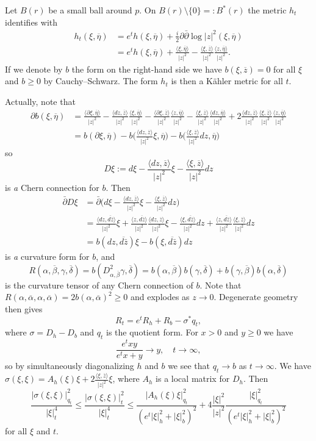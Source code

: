 \documentclass[10pt,a4paper]{amsart}
\def\<{\langle}
\def\>{\rangle}
\def\ov#1{\overline{#1}}
\begin{document}
Let $B(r)$ be a small ball around $p$.
On $B(r) \setminus \{0\} =: B^*(r)$
the metric $h_t$ identifies with
\begin{align*}
h_t(\xi, \ov\eta)
&= e^t h(\xi, \ov\eta) + \tfrac i2 \partial \bar\partial \log |z|^2(\xi, \ov\eta)
\\
&= e^t h(\xi, \ov\eta)
+ \frac{\<\xi, \ov\eta\>}{|z|^2}
- \frac{\<\xi, \ov z\>}{|z|^2}
\frac{\<z, \ov\eta\>}{|z|^2}.
\end{align*}
If we denote by $b$ the form on the right-hand side we have $b(\xi, \ov z) = 0$
for all $\xi$ and $b \geq 0$ by Cauchy--Schwarz.
The form $h_t$ is then a K\"ahler metric for all $t$.


Actually, note that
\begin{align*}
\partial b(\xi, \ov\eta)
&= \frac{\<\partial \xi, \ov\eta\>}{|z|^2}
{-} \frac{\<dz, \ov z\>}{|z|^2} \frac{\<\xi, \ov\eta\>}{|z|^2}
{-} \frac{\<\partial \xi, \ov z\>}{|z|^2} \frac{\<z, \ov\eta\>}{|z|^2}
{-} \frac{\<\xi, \ov z\>}{|z|^2} \frac{\<dz, \ov\eta\>}{|z|^2}
{+} 2\frac{\<dz, \ov z\>}{|z|^2} \frac{\<\xi, \ov z\>}{|z|^2} \frac{\<z, \ov\eta\>}{|z|^2}
\\
&= b(\partial \xi, \ov\eta)
- b\biggl(\frac{\<dz, \ov z\>}{|z|^2} \xi, \ov\eta\biggr)
- b\biggl(\frac{\<\xi, \ov z\>}{|z|^2} dz, \ov\eta\biggr)
\end{align*}
so
$$
D\xi := d \xi
- \frac{\<dz, \ov z\>}{|z|^2} \xi
- \frac{\<\xi, \ov z\>}{|z|^2} dz
$$
is \emph{a} Chern connection for $b$.
Then
\begin{align*}
\bar\partial D \xi
&= \bar\partial \biggl(
d \xi
- \frac{\<dz, \ov z\>}{|z|^2} \xi
- \frac{\<\xi, \ov z\>}{|z|^2} dz
\biggr)
\\
&= \frac{\<dz, \ov{d\bar z}\>}{|z|^2} \xi
+ \frac{\<z, \ov{d\bar z}\>}{|z|^2} \frac{\<dz, \ov z\>}{|z|^2} \xi
- \frac{\<\xi, \ov{d\bar z}\>}{|z|^2} dz
+ \frac{\<z, \ov{d\bar z}\>}{|z|^2} \frac{\<\xi, \ov z\>}{|z|^2} dz
\\
&= b(dz, \ov{d\bar z}) \xi - b(\xi, \ov{d\bar z}) dz
\end{align*}
is \emph{a} curvature form for $b$, and
$$
R(\alpha,\ov\beta,\gamma,\ov\delta)
= b(D^2_{\alpha,\ov\beta} \gamma, \ov\delta)
= b(\alpha, \ov\beta) b(\gamma, \ov\delta)
+ b(\gamma, \ov\beta) b(\alpha, \ov\delta)
$$
is the curvature tensor of any Chern connection of $b$.
Note that $R(\alpha,\ov\alpha,\alpha,\ov\alpha) = 2 b(\alpha,\ov\alpha)^2 \geq 0$
and explodes as $z \to 0$.
Degenerate geometry then gives
$$
R_t = e^t R_h + R_b - \sigma^* q_t,
$$
where $\sigma = D_h - D_b$ and $q_t$ is the quotient form.
For $x > 0$ and $y \geq 0$ we have
$$
\frac{e^t x y}{e^t x + y} \to y,
\quad
t \to \infty,
$$
so by simultaneously diagonalizing $h$ and $b$ we see that $q_t \to b$ as $t
\to \infty$.
We have $\sigma(\xi, \xi) = A_h(\xi) \xi + 2\frac{\<\xi, \ov z\>}{|z|^2} \xi$,
where $A_h$ is a local matrix for $D_h$.
Then
$$
\frac{|\sigma(\xi, \xi)|_{q_t}^2}{|\xi|_t^4}
\leq \frac{|\sigma(\xi, \xi)|_{t}^2}{|\xi|_t^4}
\leq
\frac{|A_h(\xi) \xi|^2_{q_t}}{(e^t |\xi|^2_h + |\xi|^2_b)^2}
+ 4\frac{|\xi|^2}{|z|^2}
\frac{|\xi|^2_{q_t}}{(e^t |\xi|^2_h + |\xi|^2_b)^2}
$$
for all $\xi$ and $t$.
\end{document}
